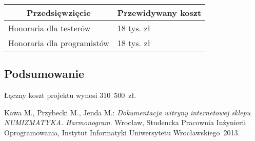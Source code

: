 \documentclass 	[11pt, a4paper, leqno]	{article}					%
\begin{document}
\begin{center}
	\begin{tabular}{| l | l |}
		\hline
		\multicolumn{1}{|c|}{Przedsięwzięcie} & 
		\multicolumn{1}{|c|}{Przewidywany koszt} \\ \hline \hline
		Honoraria dla testerów & 18 tys. zł \\ \hline
		Honoraria dla programistów & 18 tys. zł \\ \hline
	\end{tabular}
\end{center}

\subsection{Podsumowanie}
\noindent
Łączny koszt projektu wynosi \mbox{310\\\ 500 zł.} \\


\newpage
{}
\begin{thebibliography}{2}
	 Kawa M., Przybecki M., Jenda M.: \emph{Dokumentacja witryny internetowej sklepu NUMIZMATYKA. Harmonogram}. Wrocław, Studencka Pracownia Inżynierii Oprogramowania, Instytut Informatyki Uniwersytetu Wrocławskiego~2013.
\end{thebibliography}
\end{document}
